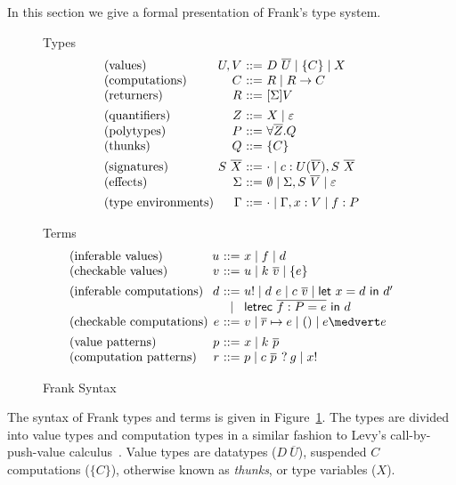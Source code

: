 \documentclass[preprint]{sigplanconf}
\makeatletter
\newcommand{\many}{\overline}
\newcommand\ba{\begin{array}}
\newcommand\ea{\end{array}}
\newenvironment{syntax}{\[\ba{@{}l@{~}r@{~}c@{~}l@{}}}{\ea\]}
\newcommand{\sig}{S}
\newcommand{\sigs}{\Sigma}
\newcommand{\effbox}[1]{[#1]}
\newcommand{\key}[1]{\mathsf{#1}}
\newcommand{\handleSymbol}{\mathbin{?}}
\newcommand{\handle}[2]{{#1} \handleSymbol {#2}}
\newcommand{\thunk}[1]{\{{#1}\}}
\newcommand{\force}[1]{{#1}!}
\newcommand\slab[1]{(\textrm{#1})}
\makeatother
\begin{document}
In this section we give a formal presentation of Frank's type system.
%
\begin{figure}
Types
\begin{syntax}
\slab{values}       &U, V          &::=& D~\many{U} \mid \thunk{C} \mid X \\
\slab{computations} &C             &::=& R \mid R \to C \\
\slab{returners}    &R             &::=& \effbox{\sigs}V
\\[1ex]
\slab{quantifiers}  &Z             &::=& X \mid \varepsilon \\
\slab{polytypes}    &P             &::=& \forall \many{Z}.Q \\
\slab{thunks}       &Q             &::=& \thunk{C}
\\[1ex]
\slab{signatures}   &\sig~\many{X} &::=& \cdot \mid c : U(\many{V}), \sig~\many{X} \\
\slab{effects}      &\sigs  &::=&
  \emptyset \mid \sigs, \sig~\many{V} \mid \varepsilon
\\[1ex]
\slab{type environments}     &\Gamma        &::=& \cdot \mid \Gamma, x:V \mid f:P \\
\end{syntax}

Terms
\begin{syntax}
\slab{inferable values}&u       &::=& x \mid f \mid d                                \\
\slab{checkable values}&v        &::=& u \mid k~\many{v} \mid \thunk{e}
\\[1ex]
\slab{inferable computations}&d &::=& \force{u} \mid d~e \mid c~\many{v}
                               \mid  \key{let}~x=d~\key{in}~d' \\
                             &&\mid& \key{letrec}~\many{f : P = e}~\key{in}~d \\
\slab{checkable computations} &e &::=& v \mid \many{r} \mapsto e \mid () \mid e \medvert e
\\[1ex]
\slab{value patterns}&p       &::=& x \mid k~\many{p}                              \\
\slab{computation patterns}&r &::=& p \mid \handle{c~\many{p}\,}{g} \mid \force{x} \\
\end{syntax}

\caption{Frank Syntax}
\label{fig:frank-syntax}
\end{figure}
%
The syntax of Frank types and terms is given in
Figure~\ref{fig:frank-syntax}. The types are divided into value types
and computation types in a similar fashion to Levy's
call-by-push-value calculus~\cite{Levy2004}.
%
Value types are datatypes ($D~\many{U}$), suspended $C$ computations
($\thunk{C}$), otherwise known as \emph{thunks}, or type variables
($X$).
\end{document}
